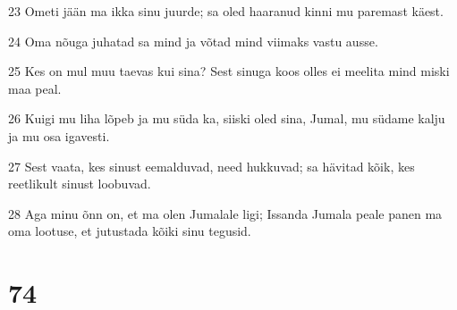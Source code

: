 \par 23 Ometi jään ma ikka sinu juurde; sa oled haaranud kinni mu paremast käest.
\par 24 Oma nõuga juhatad sa mind ja võtad mind viimaks vastu ausse.
\par 25 Kes on mul muu taevas kui sina? Sest sinuga koos olles ei meelita mind miski maa peal.
\par 26 Kuigi mu liha lõpeb ja mu süda ka, siiski oled sina, Jumal, mu südame kalju ja mu osa igavesti.
\par 27 Sest vaata, kes sinust eemalduvad, need hukkuvad; sa hävitad kõik, kes reetlikult sinust loobuvad.
\par 28 Aga minu õnn on, et ma olen Jumalale ligi; Issanda Jumala peale panen ma oma lootuse, et jutustada kõiki sinu tegusid.

\chapter{74}

